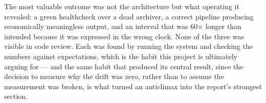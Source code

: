 The most valuable outcome was not the architecture but what operating it
revealed: a green healthcheck over a dead archiver, a correct pipeline
producing economically meaningless output, and an interval that was
60$\times$ longer than intended because it was expressed in the wrong
clock. None of the three was visible in code review. Each was found by
running the system and checking the numbers against expectations, which
is the habit this project is ultimately arguing for --- and the same
habit that produced its central result, since the decision to measure why
the drift was zero, rather than to assume the measurement was broken, is
what turned an anticlimax into the report's strongest section.
